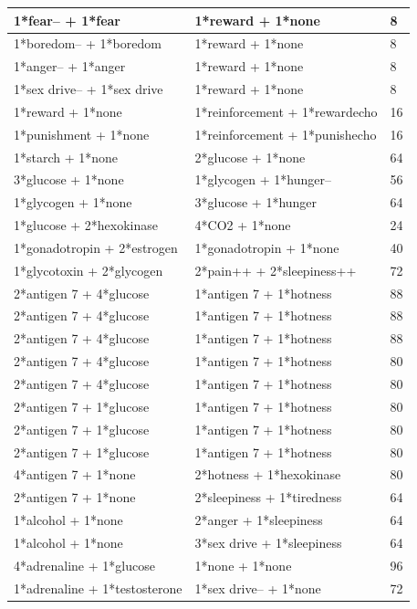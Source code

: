 \documentclass{article}
\begin{document}
\begin{longtable}{|p{5cm}|p{5cm}|p{2cm}|}
1*fear-- + 1*fear & 1*reward + 1*none & 8 \\ \hline
1*boredom-- + 1*boredom & 1*reward + 1*none & 8 \\ \hline
1*anger-- + 1*anger & 1*reward + 1*none & 8 \\ \hline
1*sex drive-- + 1*sex drive & 1*reward + 1*none & 8 \\ \hline
1*reward + 1*none & 1*reinforcement + 1*rewardecho & 16 \\ \hline
1*punishment + 1*none & 1*reinforcement + 1*punishecho & 16 \\ \hline
1*starch + 1*none & 2*glucose + 1*none & 64 \\ \hline
3*glucose + 1*none & 1*glycogen + 1*hunger-- & 56 \\ \hline
1*glycogen + 1*none & 3*glucose + 1*hunger & 64 \\ \hline
1*glucose + 2*hexokinase & 4*CO2 + 1*none & 24 \\ \hline
1*gonadotropin + 2*estrogen & 1*gonadotropin + 1*none & 40 \\ \hline
1*glycotoxin + 2*glycogen & 2*pain++ + 2*sleepiness++ & 72 \\ \hline
2*antigen 7 + 4*glucose & 1*antigen 7 + 1*hotness & 88 \\ \hline
2*antigen 7 + 4*glucose & 1*antigen 7 + 1*hotness & 88 \\ \hline
2*antigen 7 + 4*glucose & 1*antigen 7 + 1*hotness & 88 \\ \hline
2*antigen 7 + 4*glucose & 1*antigen 7 + 1*hotness & 80 \\ \hline
2*antigen 7 + 4*glucose & 1*antigen 7 + 1*hotness & 80 \\ \hline
2*antigen 7 + 1*glucose & 1*antigen 7 + 1*hotness & 80 \\ \hline
2*antigen 7 + 1*glucose & 1*antigen 7 + 1*hotness & 80 \\ \hline
2*antigen 7 + 1*glucose & 1*antigen 7 + 1*hotness & 80 \\ \hline
4*antigen 7 + 1*none & 2*hotness + 1*hexokinase & 80 \\ \hline
2*antigen 7 + 1*none & 2*sleepiness + 1*tiredness & 64 \\ \hline
1*alcohol + 1*none & 2*anger + 1*sleepiness & 64 \\ \hline
1*alcohol + 1*none & 3*sex drive + 1*sleepiness & 64 \\ \hline
4*adrenaline + 1*glucose & 1*none + 1*none & 96 \\ \hline
1*adrenaline + 1*testosterone & 1*sex drive-- + 1*none & 72 \\ \hline

\end{longtable}
\end{document}
